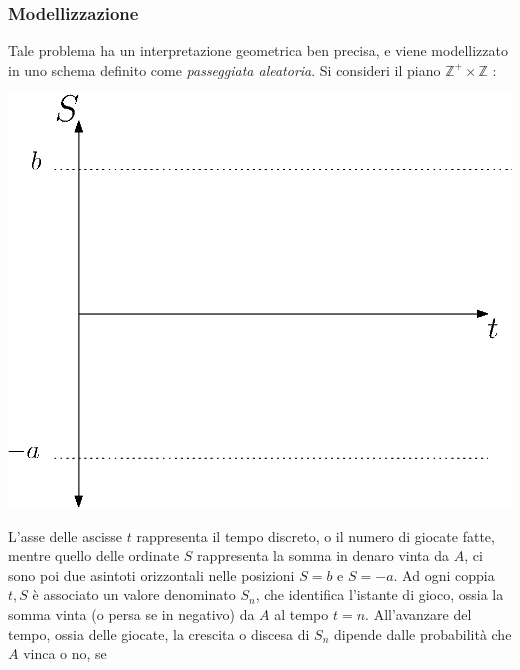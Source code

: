 \documentclass[12pt, letterpaper]{article}
\begin{document}
\subsubsection{Modellizzazione}
Tale problema ha un interpretazione geometrica ben precisa, e viene modellizzato in uno schema 
definito come \textit{passeggiata aleatoria}. Si consideri il piano \(\mathbb{Z}^+\times \mathbb{Z}\) : \\\begin{center}
    
    \includegraphics[scale=0.65]{images/PasseggiataAleatoriaPiano.eps}
\end{center}
L'asse 
delle ascisse \(t\) rappresenta il tempo discreto, o il numero 
di giocate fatte, mentre quello delle ordinate \(S\) rappresenta la somma in denaro vinta da \(A\), ci sono poi 
due asintoti orizzontali nelle posizioni \(S=b\) e \(S=-a\).
Ad ogni coppia \(t,S\) è associato un valore denominato \(S_n\), che identifica l'istante di gioco, 
ossia la somma vinta (o persa se in negativo) da \(A\) al tempo \(t=n\). All'avanzare del tempo, ossia 
delle giocate, la crescita o discesa di \(S_n\) dipende dalle probabilità che \(A\) vinca o no, se 
\end{document}

